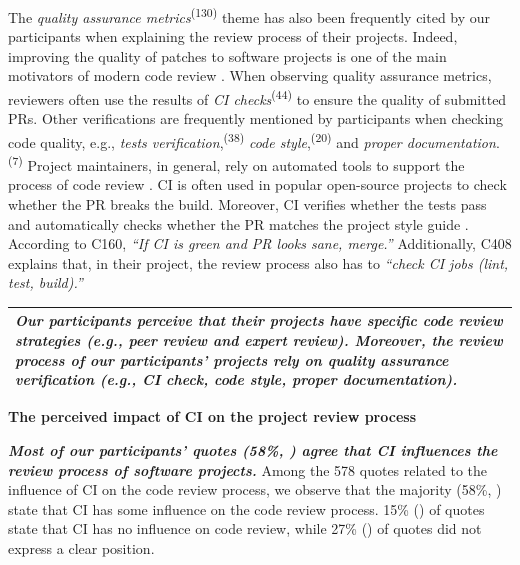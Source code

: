 	The \textit{quality assurance metrics}\textsuperscript{(130)} theme has also been frequently cited by our participants when explaining the review process of their projects. Indeed, improving the quality of patches to software projects is one of the main motivators of modern code review \citep{bacchelli2013expectations, bavota2015four}. When observing quality assurance metrics, reviewers often use the results of \textit{CI checks}\textsuperscript{(44)} to ensure the quality of submitted PRs. Other verifications are frequently mentioned by participants when checking code quality, e.g., \textit{tests verification},\textsuperscript{(38)} \textit{code style},\textsuperscript{(20)} and \textit{proper documentation}.\textsuperscript{(7)} Project maintainers, in general, rely on automated tools to support the process of code review \citep{Vasilescu2015-tn}. CI is often used in popular open-source projects to check whether the PR breaks the build. Moreover, CI verifies whether the tests pass and automatically checks whether the PR matches the project style guide \citep{cassee2020silent}. According to C160, \textit{``If CI is green and PR looks sane, merge.''} Additionally, C408 explains that, in their project, the review process also has to \textit{``check CI jobs (lint, test, build).''} 

	\begin{center}
		\begin{tabular}{|p{}|}
			\hline
			\textit{Our participants perceive that their projects have specific code review strategies (e.g., peer review and expert review). Moreover, the review process of our participants' projects rely on quality assurance verification (e.g., CI check, code style, proper documentation).}\\
			\hline
		\end{tabular}
	\end{center}

\vspace{2mm}
\noindent\textbf{The perceived impact of CI on the project review process}
\vspace{2mm}

	\textit{\textbf{Most of our participants' quotes (58\%, ) agree that CI influences the review process of software projects.}} Among the 578 quotes related to the influence of CI on the code review process, we observe that the majority (58\%, ) state that CI has some influence on the code review process. 15\% () of quotes state that CI has no influence on code review, while 27\% () of quotes did not express a clear position.

